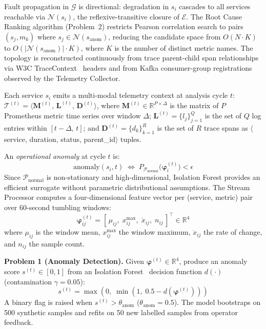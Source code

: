 \documentclass[a4paper]{lipics-v2021}
\newcommand{\mypara}[1]{{\vspace{0.1mm}\noindent\textbf{#1}}}
\begin{document}
Fault propagation in $\mathcal{G}$ is directional: degradation in $s_i$ cascades to
all services reachable via $\mathcal{N}(s_i)$, the reflexive-transitive closure of
$\mathcal{E}$. The Root Cause Ranking algorithm (Problem~2) restricts Pearson
correlation search to pairs $(s_j, m_k)$ where $s_j \in \mathcal{N}(s_{\text{anom}})$,
reducing the candidate space from $O(N{\cdot}K)$ to
$O(|\mathcal{N}(s_{\text{anom}})|{\cdot}K)$, where $K$ is the number of distinct
metric names. The topology is reconstructed continuously from trace parent-child
span relationships via W3C TraceContext~\cite{w3ctracecontext2021} headers and from
Kafka consumer-group registrations observed by the Telemetry Collector.

Each service $s_i$ emits a multi-modal telemetry context at analysis cycle $t$:
$\mathcal{T}^{(t)} = \langle \mathbf{M}^{(t)},\, \mathbf{L}^{(t)},\,
\mathbf{D}^{(t)} \rangle$, where
$\mathbf{M}^{(t)} \in \mathbb{R}^{P \times \Delta}$ is the matrix of $P$ Prometheus
metric time series over window $\Delta$;
$\mathbf{L}^{(t)} = \{l_j\}_{j=1}^{Q}$ is the set of $Q$ log entries within
$[t{-}\Delta,\, t]$; and
$\mathbf{D}^{(t)} = \{d_k\}_{k=1}^{R}$ is the set of $R$ trace spans as
$\langle$service, duration, status, parent\_id$\rangle$ tuples.

An \textit{operational anomaly} at cycle $t$ is:
\begin{equation}
    \mathrm{anomaly}(s_i, t) \;\Leftrightarrow\;
    P_{\mathcal{P}_{\text{normal}}}\!\bigl(\boldsymbol{\varphi}_i^{(t)}\bigr) < \epsilon
    \label{eq:anomaly_def}
\end{equation}
Since $\mathcal{P}_{\text{normal}}$ is non-stationary and high-dimensional,
Isolation Forest provides an efficient surrogate without parametric distributional
assumptions. The Stream Processor computes a four-dimensional feature vector per
(service, metric) pair over 60-second tumbling windows:
\begin{equation}
    \boldsymbol{\varphi}^{(t)}_{ij} =
    [\,\mu_{ij},\; x^{\max}_{ij},\; \dot{x}_{ij},\; n_{ij}\,]^\top \in \mathbb{R}^4
    \label{eq:features}
\end{equation}
where $\mu_{ij}$ is the window mean, $x^{\max}_{ij}$ the window maximum,
$\dot{x}_{ij}$ the rate of change, and $n_{ij}$ the sample count.

\mypara{Problem 1 (Anomaly Detection).}
Given $\boldsymbol{\varphi}^{(t)} \in \mathbb{R}^4$, produce an anomaly score
$s^{(t)} \in [0,1]$ from an Isolation Forest~\cite{liu2012isolation} decision
function $d(\cdot)$ (contamination $\gamma{=}0.05$):
\begin{equation}
    s^{(t)} = \max\!\left(0,\;\min\!\left(1,\;0.5 - d\!\left(\boldsymbol{\varphi}^{(t)}\right)\right)\right)
    \label{eq:anomaly}
\end{equation}
A binary flag is raised when $s^{(t)} > \theta_{\text{anom}}$ ($\theta_{\text{anom}}{=}0.5$).
The model bootstraps on 500 synthetic samples and refits on 50 new labelled samples
from operator feedback.
\end{document}

